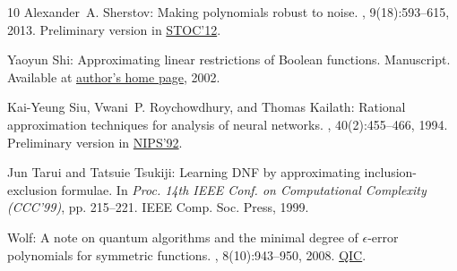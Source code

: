 \begin{thebibliography}{10}
{\sc Alexander~A. Sherstov}: Making polynomials robust to noise.
, 9(18):593--615, 2013.
\newblock Preliminary version in
  \href{http://dx.doi.org/10.1145/2213977.2214044}{STOC'12}.

{\sc Yaoyun Shi}: Approximating linear restrictions of {B}oolean functions.
\newblock Manuscript. Available at
  \href{http://web.eecs.umich.edu/~shiyy/mypapers/linear02-j.ps}{author's home
  page}, 2002.

{\sc Kai-Yeung Siu, Vwani~P. Roychowdhury, and Thomas Kailath}: Rational
  approximation techniques for analysis of neural networks.
, 40(2):455--466, 1994.
\newblock Preliminary version in
  \href{http://books.nips.cc/nips05.html}{NIPS'92}.
\newblock [\epfmtdoi{10.1109/18.312168}]

{\sc Jun Tarui and Tatsuie Tsukiji}: Learning {DNF} by approximating
  inclusion-exclusion formulae.
\newblock In {\em Proc. 14th IEEE Conf. on Computational Complexity (CCC'99)},
  pp. 215--221. IEEE Comp. Soc. Press, 1999.

{ Wolf}: A note on quantum algorithms and the minimal degree of
  $\epsilon$-error polynomials for symmetric functions.
, 8(10):943--950, 2008.
\newblock
  \href{http://www.rintonpress.com/journals/qiconline.html\#v8n10}{QIC}.

\end{thebibliography}

